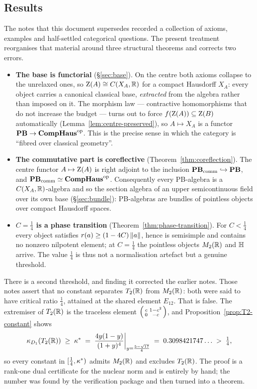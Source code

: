 \subsection{Results}

The notes that this document supersedes recorded a collection of axioms,
examples and half-settled categorical questions.  The present treatment
reorganises that material around three structural theorems and corrects two
errors.

\begin{itemize}
\item \textbf{The base is functorial} (\S\ref{sec:base}).  On the centre both
  axioms collapse to the unrelaxed ones, so $\operatorname{Z}(A)\cong C(X_A,\mathbb{R})$ for a
  compact Hausdorff $X_A$: every object carries a canonical classical base,
  \emph{extracted} from the algebra rather than imposed on it.  The morphism law
  --- contractive homomorphisms that do not increase the budget --- turns out to
  force $f(\operatorname{Z}(A))\subseteq\operatorname{Z}(B)$ automatically
  (Lemma~\ref{lem:centre-preserved}), so $A\mapsto X_A$ is a functor
  $\mathbf{PB}\to\mathbf{CompHaus}^{\mathrm{op}}$.  This is the precise sense in which the category is
  ``fibred over classical geometry''.

\item \textbf{The commutative part is coreflective}
  (Theorem~\ref{thm:coreflection}).  The centre functor $A\mapsto\operatorname{Z}(A)$ is
  right adjoint to the inclusion $\mathbf{PB}_{\mathrm{comm}}\hookrightarrow\mathbf{PB}$, and
  $\mathbf{PB}_{\mathrm{comm}}\simeq\mathbf{CompHaus}^{\mathrm{op}}$.  Consequently every PB-algebra is a
  $C(X_A,\mathbb{R})$-algebra and so the section algebra of an upper semicontinuous
  field over its own base (\S\ref{sec:bundle}): PB-algebras are bundles of
  pointless objects over compact Hausdorff spaces.

\item \textbf{$C=\tfrac14$ is a phase transition}
  (Theorem~\ref{thm:phase-transition}).  For $C<\tfrac14$ every object satisfies
  $r(a)\ge(1-4C)\left\lVert a\right\rVert$, hence is semisimple and contains no nonzero nilpotent
  element; at $C=\tfrac14$ the pointless objects $M_2(\mathbb{R})$ and $\mathbb{H}$ arrive.
  The value $\tfrac14$ is thus not a normalisation artefact but a genuine
  threshold.
\end{itemize}

There is a second threshold, and finding it corrected the earlier notes.  Those
notes assert that no constant separates $T_2(\mathbb{R})$ from $M_2(\mathbb{R})$: both were
said to have critical ratio $\tfrac14$, attained at the shared element $E_{12}$.
That is false.  The extremiser of $T_2(\mathbb{R})$ is the traceless element
$\begin{psmallmatrix}c&1-c^2\\0&-c\end{psmallmatrix}$, and
Proposition~\ref{prop:T2-constant} shows
\[
  \kappa_{D_1}(T_2(\mathbb{R}))\;\ge\;\kappa^*
  \;=\;\frac{4y(1-y)}{(1+y)^4}\bigg|_{y=\frac{5-\sqrt{17}}{4}}
  \;=\;0.3098421747\ldots\;>\;\tfrac14 ,
\]
so every constant in $[\tfrac14,\kappa^*)$ admits $M_2(\mathbb{R})$ and excludes
$T_2(\mathbb{R})$.  The proof is a rank-one dual certificate for the nuclear norm and
is entirely by hand; the number was found by the verification package and then
turned into a theorem.

